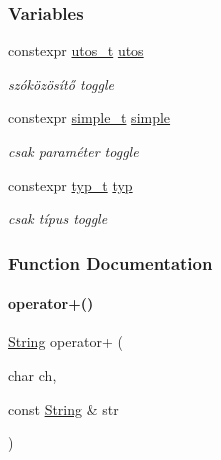 \subsubsection*{Variables}
\begin{DoxyCompactItemize}
\item 
constexpr \mbox{\hyperlink{structutos__t}{utos\+\_\+t}} \mbox{\hyperlink{schtring_8hpp_a87ab25645bb130a0e89654a4ba9d2bce}{utos}}
\begin{DoxyCompactList}\small\item\em szóközösítő toggle \end{DoxyCompactList}\item 
constexpr \mbox{\hyperlink{structsimple__t}{simple\+\_\+t}} \mbox{\hyperlink{schtring_8hpp_a351fc938310737ce89abd87ce1c8012c}{simple}}
\begin{DoxyCompactList}\small\item\em csak paraméter toggle \end{DoxyCompactList}\item 
constexpr \mbox{\hyperlink{structtyp__t}{typ\+\_\+t}} \mbox{\hyperlink{schtring_8hpp_ab0a950c0c78f879bd8908b430a0a074c}{typ}}
\begin{DoxyCompactList}\small\item\em csak típus toggle \end{DoxyCompactList}\end{DoxyCompactItemize}


\subsubsection{Function Documentation}
\mbox{\label{schtring_8hpp_a8d89d501f582c3a65df894dbd030bbcf}} 
\paragraph{\texorpdfstring{operator+()}{operator+()}}
{\footnotesize\ttfamily \mbox{\hyperlink{class_string}{String}} operator+ (\begin{DoxyParamCaption}\item[{char}]{ch,  }\item[{const \mbox{\hyperlink{class_string}{String}} \&}]{str }\end{DoxyParamCaption})\hspace{0.3cm}{\ttfamily [inline]}}



